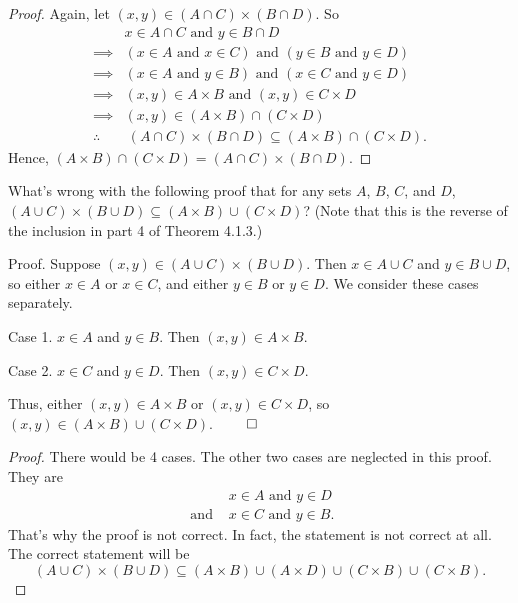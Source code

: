 \documentclass[12pt]{article}
\newenvironment{exercise}[2][Exercise]{\begin{trivlist}
\item[\hskip \labelsep {\bfseries #1}\hskip \labelsep {\bfseries #2.}]}{\end{trivlist}}
\newcommand{\nd}{\text{ and }}
\begin{document}
\begin{proof}
	Again, let $(x, y) \in (A \cap C) \times (B \cap D)$. So
	\begin{align*}
		           & x \in A \cap C \nd y \in B \cap D                                        \\
		\implies   & (x \in A \nd x \in C) \nd (y \in B \nd y \in D)                          \\
		\implies   & (x\in A \nd y\in B) \nd (x\in C \nd y\in D)                              \\
		\implies   & (x, y) \in A \times B \nd (x, y) \in C \times D                          \\
		\implies   & (x, y) \in (A \times B) \cap (C \times D)                                \\
		\therefore & \ (A \cap C) \times (B \cap D) \subseteq (A \times B) \cap (C \times D).
	\end{align*}
	Hence, $(A \times B) \cap (C \times D) = (A \cap C) \times (B \cap D)$.
\end{proof}

\begin{exercise}
	{6}
	What’s wrong with the following proof that for any sets \(A\), \(B\), \(C\), and \(D\), \((A \cup C) \times (B \cup D) \subseteq (A \times B) \cup (C \times D)\)? (Note that this is the reverse of the inclusion in part 4 of Theorem 4.1.3.)

	Proof. Suppose \((x, y) \in (A \cup C) \times (B \cup D)\). Then \(x \in A \cup C\) and \(y \in B \cup D\), so either \(x \in A\) or \(x \in C\), and either \(y \in B\) or \(y \in D\). We consider these cases separately.

	Case 1. \(x \in A\) and \(y \in B\). Then \((x, y) \in A \times B\).

	Case 2. \(x \in C\) and \(y \in D\). Then \((x, y) \in C \times D\).

	Thus, either \((x, y) \in A \times B\) or \((x, y) \in C \times D\), so \((x, y) \in (A \times B) \cup (C \times D)\). \(\qed\)
\end{exercise}

\begin{proof}
	There would be 4 cases. The other two cases are neglected in this proof. They are
	\begin{align*}
		    & x \in A \nd y \in D  \\
		\nd & x \in C \nd y \in B.
	\end{align*}
	That's why the proof is not correct. In fact, the statement is not correct at all. The correct statement will be
	\[
		(A\cup C)\times (B\cup D)\subseteq (A\times B)\cup (A\times D)\cup (C\times B)\cup (C\times B).
	\]
\end{proof}
\end{document}
